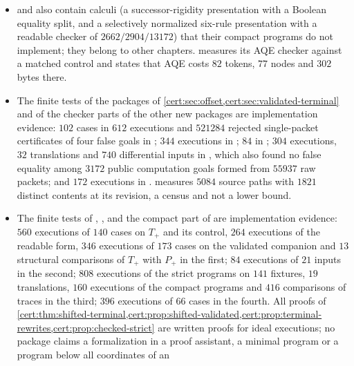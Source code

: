 \begin{itemize}
$1788$ distinct sources in  and ,
$3102$ paths in , $2894$ files in
, $297$ small acceptance modules in
) are censuses of finite corpora at their
revisions, not lower bounds.
\item {} and 
also contain calculi (a successor-rigidity presentation with a Boolean
equality split, and a selectively normalized six-rule presentation with a
readable checker of $2662/2904/13172$) that their compact programs do not
implement; they belong to other chapters. 
measures its AQE checker against a matched control and states that AQE costs
$82$ tokens, $77$ nodes and $302$ bytes there.
\item The finite tests of the packages of \cref{cert:sec:offset,cert:sec:validated-terminal}
and of the checker parts of the other new packages are implementation
evidence: $102$ cases in $612$ executions and $521284$ rejected single-packet
certificates of four false goals in ; $344$ executions in
; $84$ in ; $304$
executions, $32$ translations and $740$ differential inputs in
, which also found no false equality among $3172$ public
computation goals formed from $55937$ raw packets; and $172$ executions in
.  measures $5084$ source paths
with $1821$ distinct contents at its revision, a census and not a lower bound.
\item The finite tests of , ,
 and the compact part of 
are implementation evidence: $560$ executions of $140$ cases on $T_{+}$ and its
control, $264$ executions of the readable form, $346$ executions of $173$ cases on
the validated companion and $13$ structural comparisons of $T_{+}$ with $P_{+}$ in
the first; $84$ executions of $21$ inputs in the second; $808$ executions of the
strict programs on $141$ fixtures, $19$ translations, $160$ executions of the
compact programs and $416$ comparisons of traces in the third; $396$ executions of
$66$ cases in the fourth. All proofs of
\cref{cert:thm:shifted-terminal,cert:prop:shifted-validated,cert:prop:terminal-rewrites,cert:prop:checked-strict}
are written proofs for ideal executions; no package claims a formalization in a
proof assistant, a minimal program or a program below all coordinates of an

\end{itemize}

